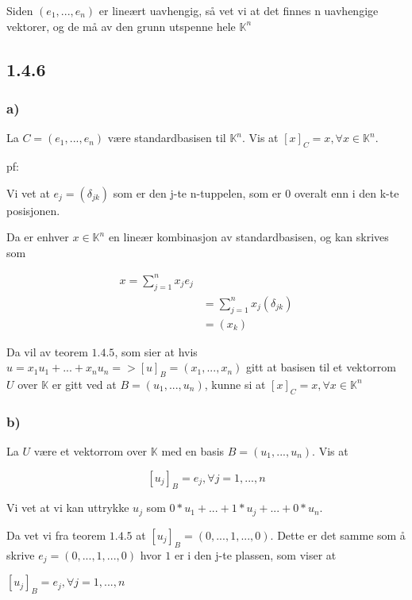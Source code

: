 \documentclass[11pt]{article}
\begin{document}
Siden $(e_1,...,e_n)$ er lineært uavhengig, så vet vi at det finnes n uavhengige vektorer, og de må av den grunn utspenne hele $\mathbb{K}^n$




\subsection{1.4.6}
\subsubsection{a)}

La $C = (e_1,..., e_n)$ være standardbasisen til $\mathbb{K}^n$. Vis at $[ x ]_C = x, \forall x \in \mathbb{K}^n$.

pf:

Vi vet at $e_j = (\delta_{jk})$ som er den j-te n-tuppelen, som er 0 overalt enn i den k-te posisjonen.

Da er enhver $x \in \mathbb{K}^n$ en lineær kombinasjon av standardbasisen, og kan skrives som

\begin{align*}
    x = \sum_{j=1}^{n} x_j e_j \\
    &= \sum_{j=1}^{n} x_j (\delta_{jk}) \\
    &= (x_k)
\end{align*}

\vspace{1em}

Da vil av teorem $1.4.5$, som sier at hvis $u = x_1 u_1+...+x_n u_n => [u]_B = (x_1,...,x_n)$ gitt at basisen til et vektorrom $U$ over $\mathbb{K}$ er gitt ved at $B=(u_1,...,u_n)$, kunne si at
$[x]_C = x,  \forall x \in \mathbb{K}^n$



\subsubsection{b)}

La $U$ være et vektorrom over $\mathbb{K}$ med en basis $B=(u_1,...,u_n)$. Vis at 

$$
[u_j]_B = e_j, \forall j =1,...,n
$$

Vi vet at vi kan uttrykke $u_j$ som $0 * u_1 + ... + 1 * u_j + ... + 0 * u_n$.

Da vet vi fra teorem $1.4.5$  at $[u_j]_B = (0,...,1,...,0)$. Dette er det samme som å skrive $e_j = (0,...,1,...,0)$ hvor $1$ er i den j-te plassen, som viser at

$[u_j]_B = e_j, \forall j = 1,...,n$
\end{document}
